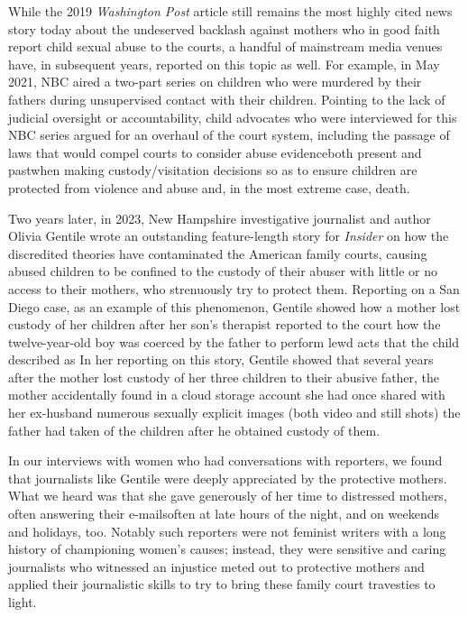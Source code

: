While the 2019 \textit{Washington Post} article still remains the most highly
cited news story today about the undeserved backlash against mothers
who in good faith report child sexual abuse to the courts, a handful of
mainstream media venues have, in subsequent years, reported on this
topic as well. For example, in May 2021, NBC aired a two-part series
on children who were murdered by their fathers during unsupervised
contact with their children. Pointing to the lack of judicial oversight or
accountability, child advocates who were interviewed for this NBC series 
argued for an overhaul of the court system, including the passage
of laws that would compel courts to consider abuse evidence\mdash{}both
present and past\mdash{}when making custody/visitation decisions so as to
ensure children are protected from violence and abuse and, in the most
extreme case, death. \pfl{}


Two years later, in 2023, New Hampshire investigative journalist
and author Olivia Gentile wrote an outstanding feature-length story
for \textit{Insider} on how the discredited  theories have
contaminated the American family courts, causing abused children to
be confined to the custody of their abuser with little or no access to
their mothers, who strenuously try to protect them. 
Reporting on a San Diego
case, as an example of this phenomenon, Gentile showed how a mother
lost custody of her children after her son's therapist reported to the
court how the twelve-year-old boy was coerced by the father to 
perform lewd acts that the child described as  In her reporting
on this story, Gentile showed that several years after the mother lost
custody of her three children to their abusive father, the mother 
accidentally found in a cloud storage account she had once shared with
her ex-husband numerous sexually explicit images (both video and still
shots) the father had taken of the children after he obtained custody of
them. \pfl{}

In our interviews with women who had conversations with reporters,
we found that journalists like Gentile were deeply appreciated by the
protective mothers. What we heard was that she gave generously of
her time to distressed mothers, often answering their e-mails\mdash{}often at
late hours of the night, and on weekends and holidays, too. Notably such
reporters were not feminist writers with a long history of championing
women's causes; instead, they were sensitive and caring 
journalists who witnessed an injustice meted out 
to protective mothers and applied their
journalistic skills to try to bring these family court 
travesties to light. \pfl{}


